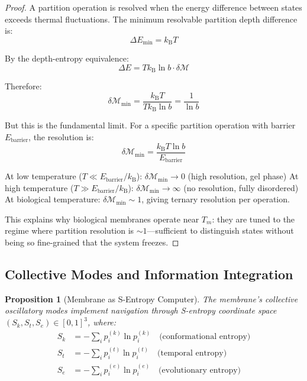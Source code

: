 \documentclass[twocolumn,10pt]{article}
\newtheorem{proposition}[theorem]{Proposition}
\theoremstyle{remark}
\newcommand{\kB}{k_{\mathrm{B}}}
\newcommand{\Depth}{\mathcal{M}}
\newcommand{\Sk}{S_k}
\newcommand{\St}{S_t}
\newcommand{\Se}{S_e}
\begin{document}
\begin{proof}
A partition operation is resolved when the energy difference between states exceeds thermal fluctuations. The minimum resolvable partition depth difference is:
\begin{equation}
    \Delta E_{\min} = \kB T
\end{equation}

By the depth-entropy equivalence:
\begin{equation}
    \Delta E = T \kB \ln b \cdot \delta\Depth
\end{equation}

Therefore:
\begin{equation}
    \delta\Depth_{\min} = \frac{\kB T}{T \kB \ln b} = \frac{1}{\ln b}
\end{equation}

But this is the fundamental limit. For a specific partition operation with barrier $E_{\text{barrier}}$, the resolution is:
\begin{equation}
    \delta\Depth_{\min} = \frac{\kB T \ln b}{E_{\text{barrier}}}
\end{equation}

At low temperature ($T \ll E_{\text{barrier}}/\kB$): $\delta\Depth_{\min} \to 0$ (high resolution, gel phase)
At high temperature ($T \gg E_{\text{barrier}}/\kB$): $\delta\Depth_{\min} \to \infty$ (no resolution, fully disordered)
At biological temperature: $\delta\Depth_{\min} \sim 1$, giving ternary resolution per operation.

This explains why biological membranes operate near $T_m$: they are tuned to the regime where partition resolution is $\sim 1$---sufficient to distinguish states without being so fine-grained that the system freezes.
\end{proof}

\subsection{Collective Modes and Information Integration}

\begin{proposition}[Membrane as S-Entropy Computer]
\label{prop:s_entropy}
The membrane's collective oscillatory modes implement navigation through S-entropy coordinate space $(\Sk, \St, \Se) \in [0,1]^3$, where:
\begin{align}
    \Sk &= -\sum_i p_i^{(k)} \ln p_i^{(k)} \quad \text{(conformational entropy)} \\
    \St &= -\sum_i p_i^{(t)} \ln p_i^{(t)} \quad \text{(temporal entropy)} \\
    \Se &= -\sum_i p_i^{(e)} \ln p_i^{(e)} \quad \text{(evolutionary entropy)}
\end{align}
\end{proposition}
\end{document}

